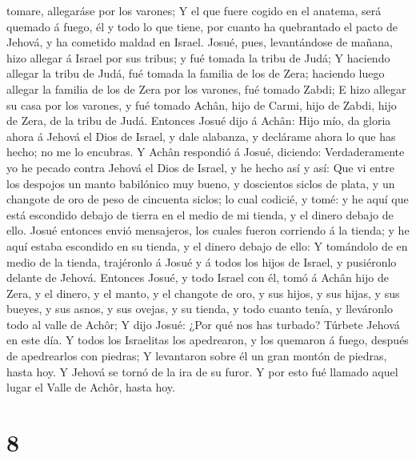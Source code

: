 tomare, allegaráse por los varones;  Y el que fuere cogido
en el anatema, será quemado á fuego, él y todo lo que tiene, por cuanto
ha quebrantado el pacto de Jehová, y ha cometido maldad en Israel.
 Josué, pues, levantándose de mañana, hizo allegar á Israel
por sus tribus; y fué tomada la tribu de Judá;  Y haciendo
allegar la tribu de Judá, fué tomada la familia de los de Zera; haciendo
luego allegar la familia de los de Zera por los varones, fué tomado
Zabdi;  E hizo allegar su casa por los varones, y fué
tomado Achân, hijo de Carmi, hijo de Zabdi, hijo de Zera, de la tribu de
Judá.  Entonces Josué dijo á Achân: Hijo mío, da gloria
ahora á Jehová el Dios de Israel, y dale alabanza, y declárame ahora lo
que has hecho; no me lo encubras.  Y Achân respondió á
Josué, diciendo: Verdaderamente yo he pecado contra Jehová el Dios de
Israel, y he hecho así y así:  Que vi entre los despojos un
manto babilónico muy bueno, y doscientos siclos de plata, y un changote
de oro de peso de cincuenta siclos; lo cual codicié, y tomé: y he aquí
que está escondido debajo de tierra en el medio de mi tienda, y el
dinero debajo de ello.  Josué entonces envió mensajeros,
los cuales fueron corriendo á la tienda; y he aquí estaba escondido en
su tienda, y el dinero debajo de ello:  Y tomándolo de en
medio de la tienda, trajéronlo á Josué y á todos los hijos de Israel, y
pusiéronlo delante de Jehová.  Entonces Josué, y todo
Israel con él, tomó á Achân hijo de Zera, y el dinero, y el manto, y el
changote de oro, y sus hijos, y sus hijas, y sus bueyes, y sus asnos, y
sus ovejas, y su tienda, y todo cuanto tenía, y lleváronlo todo al valle
de Achôr;  Y dijo Josué: ¿Por qué nos has turbado? Túrbete
Jehová en este día. Y todos los Israelitas los apedrearon, y los
quemaron á fuego, después de apedrearlos con piedras;  Y
levantaron sobre él un gran montón de piedras, hasta hoy. Y Jehová se
tornó de la ira de su furor. Y por esto fué llamado aquel lugar el Valle
de Achôr, hasta hoy.

\hypertarget{section-7}{%
\section{8}\label{section-7}}

